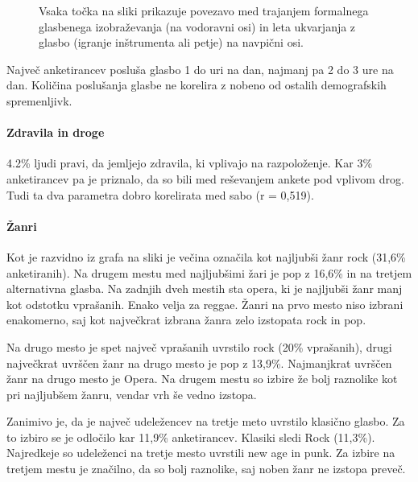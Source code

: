 \documentclass[a4paper, 12pt]{book}
\begin{document}
{\begin{figure}[hbt]
\caption{Vsaka točka na sliki prikazuje povezavo med trajanjem formalnega glasbenega izobraževanja (na vodoravni osi) in leta ukvarjanja z glasbo (igranje inštrumenta ali petje) na navpični osi. }
\label{ukvarjanjeglizobrazba}
\end{figure}

Največ anketirancev posluša glasbo 1 do uri na dan, najmanj pa 2 do 3 ure na dan. Količina poslušanja glasbe ne korelira z nobeno od ostalih demografskih spremenljivk. 

\paragraph{Zdravila in droge}

4.2\% ljudi pravi, da jemljejo zdravila, ki vplivajo na razpoloženje. Kar 3\% anketirancev pa je priznalo, da so bili med reševanjem ankete pod vplivom drog. Tudi ta dva parametra dobro korelirata med sabo (r = 0,519).

\paragraph{Žanri}

Kot je razvidno iz grafa na sliki \cite{zanrigraf} je večina označila kot najljubši žanr rock (31,6\% anketiranih). Na drugem mestu med najljubšimi žari je pop z 16,6\% in na tretjem alternativna glasba. Na zadnjih dveh mestih sta opera, ki je najljubši žanr manj kot odstotku vprašanih. Enako velja za reggae. Žanri na prvo mesto niso izbrani enakomerno, saj kot največkrat izbrana žanra zelo izstopata rock in pop.  

Na drugo mesto je spet največ vprašanih uvrstilo rock (20\% vprašanih), drugi največkrat uvrščen žanr na drugo mesto je pop z 13,9\%. Najmanjkrat uvrščen žanr na drugo mesto je Opera. Na drugem mestu so izbire že bolj raznolike kot pri najljubšem žanru, vendar vrh še vedno izstopa. 

Zanimivo je, da je največ udeležencev na tretje meto uvrstilo klasično glasbo. Za to izbiro se je odločilo kar 11,9\% anketirancev. Klasiki sledi Rock (11,3\%). Najredkeje so udeleženci na tretje mesto uvrstili new age in punk. Za izbire na tretjem mestu je značilno, da so bolj raznolike, saj noben žanr ne izstopa preveč. 

}
\end{document}
